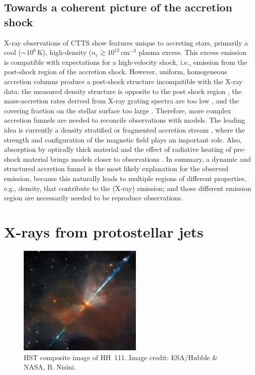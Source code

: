 \documentclass[graybox, nosecnum]{svmult}
\begin{document}
\subsection{Towards a coherent picture of the accretion shock}
X-ray observations of CTTS show features unique to accreting stars, primarily a cool ($\sim10^6\,$K), high-density ($n_e\gtrsim10^{12}\,$cm$^{-3}$ plasma excess. This excess emission is compatible with expectations for a high-velocity shock, i.e., emission from the post-shock region of the accretion shock. However, uniform, homogeneous accretion columns produce a post-shock structure incompatible with the X-ray data: the measured density structure is opposite to the post shock region \cite{Brickhouse_2010}, the mass-accretion rates derived from X-ray grating spectra are too low \cite{2011A&A...526A.104C}, and the covering fraction on the stellar surface too large \cite{Schneider_2018}. Therefore, more complex accretion funnels are needed to reconcile observations with models. The leading idea is currently a density stratified or fragmented accretion stream \cite{Colombo_2016}, where the strength and configuration of the magnetic field plays an important role. Also, absorption by optically thick material and the effect of radiative heating of pre-shock material brings models closer to observations \cite{Colombo_2019b}. In summary, a dynamic and structured accretion funnel is the most likely explanation for the observed emission, because this naturally leads to multiple  regions of different properties, e.g., density, that contribute to the (X-ray) emission; and those different emission region are necessarily needed to be reproduce observations.



\section{X-rays from protostellar jets}

\begin{figure}[t]
 \centering
\includegraphics[width=6cm]{figs/HH111_-_HST_-_Potw2135a.jpg}
\caption{HST composite image of HH~111. Image credit: ESA/Hubble \& NASA, B. Nisini. \label{fig:HH111} }
\end{figure}
\end{document}

